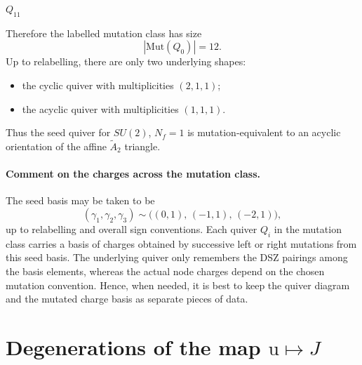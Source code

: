 \documentclass[11pt, a4paper]{article}
\newcommand{\qvertices}{
  \node[qnode] (1) at (90:1.05) {$1$};
  \node[qnode] (2) at (210:1.05) {$2$};
  \node[qnode] (3) at (330:1.05) {$3$};
}
\newcommand{\ur}{\mathrm{u}}
\numberwithin{equation}{section}
\begin{document}
\begin{center}
\begin{minipage}{0.24\textwidth}
\end{minipage}
\begin{minipage}{0.24\textwidth}\centering
\(Q_{11}\)

\end{minipage}

\end{center}

Therefore the labelled mutation class has size
\[
|\mathrm{Mut}(Q_0)|=12.
\]
Up to relabelling, there are only two underlying shapes:
\begin{itemize}
\item the cyclic quiver with multiplicities \((2,1,1)\);
\item the acyclic quiver with multiplicities \((1,1,1)\).
\end{itemize}
Thus the seed quiver for \(SU(2)\), \(N_f=1\) is mutation-equivalent to an
acyclic orientation of the affine \(\widetilde A_2\) triangle.

\paragraph{Comment on the charges across the mutation class.}
The seed basis may be taken to be
\[
(\gamma_1,\gamma_2,\gamma_3)\sim \bigl((0,1),\,(-1,1),\,(-2,1)\bigr),
\]
up to relabelling and overall sign conventions. Each quiver \(Q_i\) in the
mutation class carries a basis of charges obtained by successive left or right
mutations from this seed basis. The underlying quiver only remembers the DSZ
pairings among the basis elements, whereas the actual node charges depend on the
chosen mutation convention. Hence, when needed, it is best to keep the quiver
diagram and the mutated charge basis as separate pieces of data.



\section{Degenerations of the map \texorpdfstring{$\ur \mapsto J$}{ur -> J}}
\label{sec:degenerations-J-ur}
\end{document}
